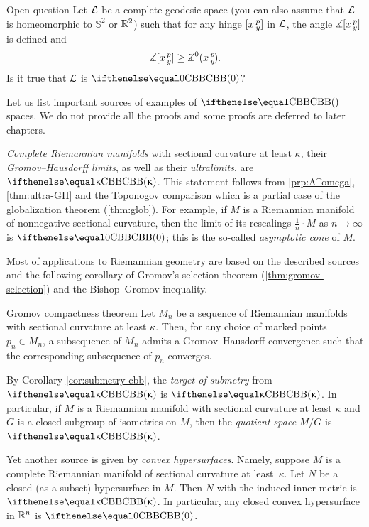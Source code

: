 \begin{thm}{Open question}\label{open:hinge-}
Let $\mathcal{L}$ be a complete geodesic space (you can also assume that $\mathcal{L}$ is homeomorphic to $\mathbb{S}^2$ or $\mathbb{R}^2$) 
such that for any hinge $[x\,{}^{p}_{y}]$ in $\mathcal{L}$, 
the angle $\measuredangle[x\,{}^{p}_{y}]$ is defined and 
\[\mangle\hinge x p y\ge\angk0 x p y.\]
Is it true that $\mathcal{L}$ is $\Alex{0}$?
\end{thm}

Let us list important sources of examples of $\Alex{}$ spaces.
We do not provide all the proofs and some proofs are deferred to later chapters.

\textit{Complete Riemannian manifolds} with sectional curvature at least $\kappa$, their \textit{Gromov--Hausdorff limits}, as well as their \textit{ultralimits}, are $\Alex\kappa$.
This statement follows from \ref{prp:A^omega}, \ref{thm:ultra-GH} and the Toponogov comparison which is a partial case of the globalization theorem (\ref{thm:glob}).
For example, 
if $M$ is a Riemannian manifold of nonnegative sectional curvature,
then the limit of its rescalings $\tfrac1n\cdot M$ as $n\to \infty$ is $\Alex0$; this is the so-called \textit{asymptotic cone} of $M$.

Most of applications to  Riemannian geometry are based on the described sources and the following corollary of Gromov's selection theorem (\ref{thm:gromov-selection}) and the Bishop--Gromov inequality.

\begin{thm}{Gromov compactness theorem}
Let $M_n$ be a sequence of Riemannian manifolds with sectional curvature at least $\kappa$. 
Then, for any choice of marked points $p_n\in M_n$,
a subsequence of $M_n$ admits a Gromov--Hausdorff convergence 
such that the corresponding subsequence of $p_n$ converges.
\end{thm}

By Corollary \ref{cor:submetry-cbb}, the \textit{target of submetry} from $\Alex\kappa$ is $\Alex\kappa$.
In particular, if $M$ is a Riemannian manifold with sectional curvature at least $\kappa$ and 
$G$ is a closed subgroup of isometries on $M$,
then the \textit{quotient space} $M/G$ is $\Alex\kappa$.

Yet another source is given by \textit{convex hypersurfaces}.
Namely, suppose $M$ is a complete Riemannian manifold of sectional curvature at least~$\kappa$.
Let $N$ be a closed (as a subset) hypersurface in $M$.
Then $N$ with the induced inner metric is $\Alex{\kappa}$.
In particular, any closed  convex hypersurface in $\mathbb{R}^n$ is $\Alex{0}$.

